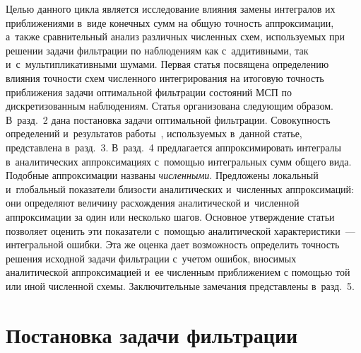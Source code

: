 \begin{multicols}{2}
Целью данного цикла является исследование влияния замены интегралов 
их приближениями  в~виде конечных сумм на общую точность аппроксимации, 
а~также сравнительный  анализ различных численных схем, используемых при 
решении задачи фильтрации по наблюдениям как с~аддитивными, так 
и~с~мультипликативными шумами. 
Первая статья посвящена определению влияния точности схем численного 
интегрирования на итоговую точность приближения задачи оптимальной 
фильтрации состояний МСП по дискретизованным наблюдениям. Статья 
организована сле\-ду\-ющим образом. В~разд.~2 дана постановка задачи 
оптимальной фильтрации. Совокупность определений и~результатов работы~\cite{B_18_IA}, 
используемых в~данной статье, представлена в~разд.~3. В~разд.~4 
предлагается аппроксимировать интегралы в~аналитических аппроксимациях 
с~по\-мощью интегральных сумм общего вида. Подобные аппроксимации названы 
\textit{численными}. Предложены локальный и~глобальный показатели близости 
аналитических и~численных аппроксимаций: они определяют величину 
расхождения аналитической и~численной аппроксимации за один или несколько шагов. 
Основное утверждение статьи позволяет оценить эти показатели с~помощью 
аналитической характеристики~--- интегральной ошибки. Эта же оценка дает
 возможность определить точность решения исходной задачи фильтрации с~учетом ошибок, вносимых аналитической аппроксимацией и~ее численным приближением
с помощью той или иной численной схемы. Заключительные замечания 
представлены в~разд.~5.

 \section{Постановка задачи фильтрации}
 

\end{multicols}
